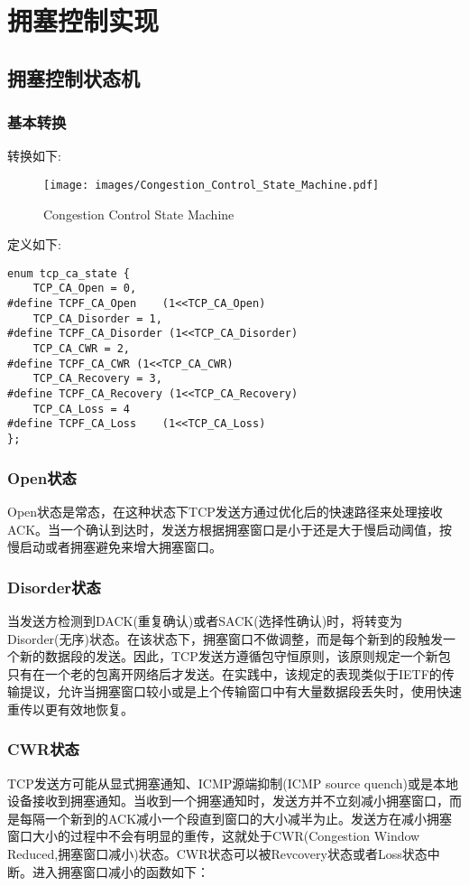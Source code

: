 \section{拥塞控制实现}

    \subsection{拥塞控制状态机}
        \subsubsection{基本转换}
        转换如下:
            \begin{figure}[htb]        
                \centering
                \texttt{[image: images/Congestion\_Control\_State\_Machine.pdf]}
                \caption{Congestion Control State Machine}
                \label{Congestion Control State Machine}
            \end{figure} 
    
        定义如下:
\begin{verbatim}
enum tcp_ca_state {
    TCP_CA_Open = 0,
#define TCPF_CA_Open    (1<<TCP_CA_Open)
    TCP_CA_Disorder = 1,
#define TCPF_CA_Disorder (1<<TCP_CA_Disorder)
    TCP_CA_CWR = 2,
#define TCPF_CA_CWR (1<<TCP_CA_CWR)
    TCP_CA_Recovery = 3,
#define TCPF_CA_Recovery (1<<TCP_CA_Recovery)
    TCP_CA_Loss = 4
#define TCPF_CA_Loss    (1<<TCP_CA_Loss)
};
\end{verbatim}
        \subsubsection{Open状态}
            Open状态是常态，在这种状态下TCP发送方通过优化后的快速路径来处理接收ACK。当一个确认到达时，发送方根据拥塞窗口是小于还是大于慢启动阈值，按慢启动或者拥塞避免来增大拥塞窗口。

        \subsubsection{Disorder状态}
            当发送方检测到DACK(重复确认)或者SACK(选择性确认)时，将转变为Disorder(无序)状态。在该状态下，拥塞窗口不做调整，而是每个新到的段触发一个新的数据段的发送。因此，TCP发送方遵循包守恒原则，该原则规定一个新包只有在一个老的包离开网络后才发送。在实践中，该规定的表现类似于IETF的传输提议，允许当拥塞窗口较小或是上个传输窗口中有大量数据段丢失时，使用快速重传以更有效地恢复。

        \subsubsection{CWR状态}
            \label{CongestionState:CWR}
            TCP发送方可能从显式拥塞通知、ICMP源端抑制(ICMP source quench)或是本地设备接收到拥塞通知。当收到一个拥塞通知时，发送方并不立刻减小拥塞窗口，而是每隔一个新到的ACK减小一个段直到窗口的大小减半为止。发送方在减小拥塞窗口大小的过程中不会有明显的重传，这就处于CWR(Congestion Window Reduced,拥塞窗口减小)状态。CWR状态可以被Revcovery状态或者Loss状态中断。进入拥塞窗口减小的函数如下：

